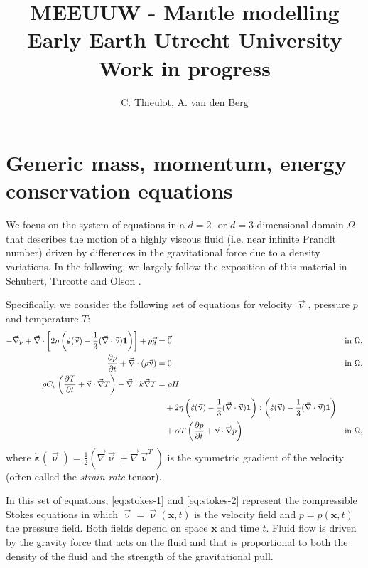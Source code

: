 \documentclass[a4paper]{article}
\title{MEEUUW - Mantle modelling Early Earth Utrecht University Work in progress}
\author{C. Thieulot, A. van den Berg}
\begin{document}
\maketitle

\section{Generic mass, momentum, energy conservation equations}

We focus on the system of equations in a $d=2$- or $d=3$-dimensional
domain $\Omega$ that describes the motion of a highly viscous fluid (i.e.
near infinite Prandlt number) driven
by differences in the gravitational force due to a density variations. 
In the following, we largely follow the exposition of this
material in Schubert, Turcotte and Olson \cite{scto01}.

Specifically, we consider the following set of equations for 
velocity $\vec\upnu$, pressure $p$ and temperature $T$:
\begin{align}
  \label{eq:stokes-1}
  - \vec\nabla p +  
  \vec\nabla \cdot \left[2\eta \left(\dot{\bm \varepsilon}(\vec \upnu)
                                  - \frac{1}{3}(\vec\nabla \cdot \vec \upnu)\mathbf 1\right)
                \right] +  \rho \vec g &= \vec{0}
  &
  & \textrm{in $\Omega$},
  \\
  \label{eq:stokes-2}
  \frac{\partial \rho}{\partial t} + \vec\nabla \cdot (\rho \vec \upnu) &= 0
  &
  & \textrm{in $\Omega$},
  \\
  \label{eq:temperature}
  \rho C_p \left(\frac{\partial T}{\partial t} + \vec \upnu\cdot\vec\nabla T\right)
  - \vec\nabla\cdot k\vec\nabla T
  &=
  \rho H
  \notag
  \\
  &\quad
  +
  2\eta
  \left(\dot\varepsilon(\vec\upnu) - \frac{1}{3}(\vec\nabla \cdot \vec \upnu)\mathbf 1\right)
  :
  \left(\dot\varepsilon(\vec\upnu) - \frac{1}{3}(\vec\nabla \cdot \vec \upnu)\mathbf 1\right)
  \\
  &\quad
  +\alpha T \left( \frac{\partial p}{\partial t} +  \vec \upnu \cdot \vec\nabla p \right)
  && \textrm{in $\Omega$},
\end{align}
where $\dot{\bm \varepsilon}(\vec\upnu) = \frac{1}{2}(\vec\nabla \vec\upnu + \vec\nabla \vec\upnu^T)$
is the symmetric gradient of the velocity (often called the
\textit{strain rate} tensor).

In this set of equations, \eqref{eq:stokes-1} and \eqref{eq:stokes-2}
represent the compressible Stokes equations in which $\vec\upnu =\vec\upnu (\mathbf x,t)$
is the velocity field and $p=p(\mathbf x,t)$ the pressure
field. Both fields depend on space $\mathbf x$ and time $t$. Fluid flow is
driven by the gravity force that acts on the fluid and that is proportional to
both the density of the fluid and the strength of the gravitational pull.
\end{document}
